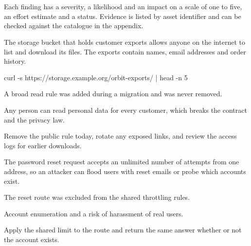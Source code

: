\section{\lblFindings}
Each finding has a severity, a likelihood and an impact on a scale of one to
five, an effort estimate and a status. Evidence is listed by asset identifier
and can be checked against the catalogue in the appendix.

\begin{finding}[id=F-01,title={Customer exports are publicly readable},
    severity=critical,likelihood=5,impact=5,effort=small,status=open]
  \findingpart{\lblDescription}
  The storage bucket that holds customer exports allows anyone on the
  internet to list and download its files. The exports contain names, email
  addresses and order history.

  \findingpart{\lblReproduction}
  \begin{code}[lang=bash]
curl -s https://storage.example.org/orbit-exports/ | head -n 5
  \end{code}

  \findingpart{\lblRootCause}
  A broad read rule was added during a migration and was never removed.

  \findingpart{\lblImpact}
  Any person can read personal data for every customer, which breaks the
  contract and the privacy law.

  \findingpart{\lblRecommendation}
  Remove the public rule today, rotate any exposed links, and review the
  access logs for earlier downloads.

  \findingpart{\lblEvidence}
  \begin{evidence}
  \end{evidence}
\end{finding}

\begin{finding}[id=F-02,title={Password reset has no rate limit},
    severity=high,likelihood=4,impact=4,effort=medium,status=open]
  \findingpart{\lblDescription}
  The password reset request accepts an unlimited number of attempts from
  one address, so an attacker can flood users with reset emails or probe
  which accounts exist.

  \findingpart{\lblRootCause}
  The reset route was excluded from the shared throttling rules.

  \findingpart{\lblImpact}
  Account enumeration and a risk of harassment of real users.

  \findingpart{\lblRecommendation}
  Apply the shared limit to the route and return the same answer whether or
  not the account exists.

  \findingpart{\lblEvidence}
  \begin{evidence}
  \end{evidence}
\end{finding}

